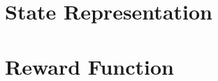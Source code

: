 \section{State Representation}\label{sec:environment-state-representation}


\section{Reward Function}\label{sec:environment-reward-function}
